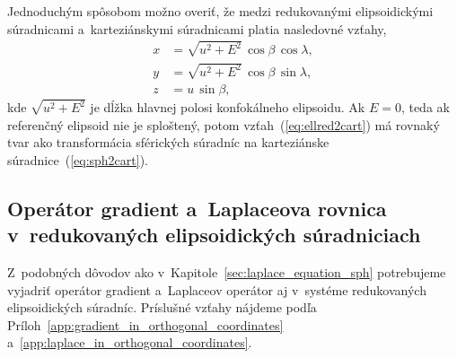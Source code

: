 \documentclass[a4paper,12pt]{book}
\begin{document}
Jednoduchým spôsobom možno overiť, že medzi redukovanými elipsoidickými 
súradnicami a~karteziánskymi súradnicami platia nasledovné vzťahy,
%
\begin{equation}
\label{eq:ellred2cart}
\begin{split}
x &= \sqrt{u^2 + E^2} \, \cos\beta \, \cos\lambda{,}\\
y &= \sqrt{u^2 + E^2} \, \cos\beta \, \sin\lambda{,}\\
z &= u \, \sin\beta{,}
\end{split}
\end{equation}
%
kde $\sqrt{u^2 + E^2}$ je dĺžka hlavnej polosi konfokálneho elipsoidu.  Ak $E 
= 0$, teda ak referenčný elipsoid nie je sploštený, potom 
vzťah~(\ref{eq:ellred2cart}) má rovnaký tvar ako transformácia sférických 
súradníc na karteziánske súradnice~(\ref{eq:sph2cart}).



\subsection{Operátor gradient a~Laplaceova rovnica v~redukovaných 
elipsoidických súradniciach}
\label{sec:gradient_and_laplace_in_reduced_ell_coords}

Z~podobných dôvodov ako v~Kapitole~\ref{sec:laplace_equation_sph} potrebujeme 
vyjadriť operátor gradient a~Laplaceov operátor aj v~systéme redukovaných 
elipsoidických súradníc.  Príslušné vzťahy nájdeme podľa 
Príloh~\ref{app:gradient_in_orthogonal_coordinates} 
a~\ref{app:laplace_in_orthogonal_coordinates}.
\end{document}
